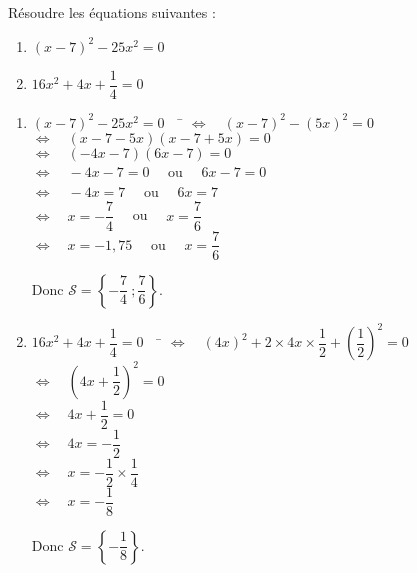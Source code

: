 \documentclass[a4paper,11pt,exos]{nsi} %
\begin{document}
\maketitle

\begin{exercice}
    Résoudre les équations suivantes :
    \begin{multicols}{2}
        \begin{enumerate}
            \item $(x-7)^2-25x^2=0$
	        \item $16x^2+4x+\dfrac{1}{4}=0$
        \end{enumerate}
    \end{multicols}
    
\end{exercice}

\begin{enumerate}
    \item \begin{tabbing}
        $(x-7)^2-25x^2=0 \quad$    \=  $\iff\quad (x-7)^2-(5x)^2=0$\\
        \>  $\iff\quad  (x-7-5x)(x-7+5x)=0$\\
        \>  $\iff\quad  (-4x-7)(6x-7)=0$\\
        \>  $\iff\quad  -4x-7=0 \quad$ ou $\quad 6x-7=0$\\
        \>  $\iff\quad  -4x=7\quad$ ou $\quad 6x = 7$\\
        \>  $\iff\quad  x=-\dfrac{7}{4}\quad$ ou $\quad x=\dfrac{7}{6}$\\
        \>  $\iff\quad  x=-1,75\quad$ ou $\quad x=\dfrac{7}{6}$
    \end{tabbing}
    Donc $\mathcal{S}=\left\{-\dfrac{7}{4}\ ;\dfrac{7}{6} \right\}$.

    \item \begin{tabbing}
        $16x^2+4x+\dfrac{1}{4}=0 \quad$    \=  $\iff\quad \left(4x\right)^2+2\times 4x\times \dfrac{1}{2} +\left(\dfrac{1}{2}\right)^2=0$\\[.5em]
        \>  $\iff\quad  \left(4x+\dfrac{1}{2}\right)^2=0$\\[.5em]
        \>  $\iff\quad  4x+\dfrac{1}{2}=0$\\[.5em]
        \>  $\iff\quad  4x=-\dfrac{1}{2}$\\[.5em]
        \>  $\iff\quad  x=-\dfrac{1}{2}\times \dfrac{1}{4}$\\[.5em]
        \>  $\iff\quad  x=-\dfrac{1}{8}$
    \end{tabbing}
    Donc $\mathcal{S}=\left\{-\dfrac{1}{8} \right\}$.
\end{enumerate}
\end{document}
